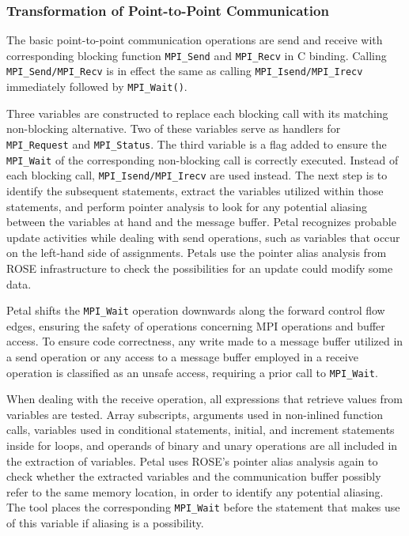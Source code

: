 \subsubsection{Transformation of Point-to-Point Communication}

The basic point-to-point communication operations are send and receive with corresponding blocking function  \texttt{MPI\_Send} and \texttt{MPI\_Recv} in C binding. 
Calling \texttt{MPI\_Send/MPI\_Recv} is in effect the same as calling \texttt{MPI\_Isend/MPI\_Irecv} immediately followed by \texttt{MPI\_Wait()}.

Three variables are constructed to replace each blocking call with its matching non-blocking alternative. 
Two of these variables serve as handlers for \texttt{MPI\_Request} and \texttt{MPI\_Status}. The third variable is a flag added to ensure the \texttt{MPI\_Wait} of the corresponding non-blocking call is correctly executed. 
Instead of each blocking call, \texttt{MPI\_Isend/MPI\_Irecv} are used instead. The next step is to identify the subsequent statements, extract the variables utilized within those statements, and perform pointer analysis to look for any potential aliasing between the variables at hand and the message buffer. 
Petal recognizes probable update activities while dealing with send operations, such as variables that occur on the left-hand side of assignments. 
Petals use the pointer alias analysis from ROSE infrastructure to check the possibilities for an update could modify some data.

Petal shifts the \texttt{MPI\_Wait} operation downwards along the forward control flow edges, ensuring the safety of operations concerning MPI operations and buffer access. 
To ensure code correctness, any write made to a message buffer utilized in a send operation or any access to a message buffer employed in a receive operation is classified as an unsafe access, requiring a prior call to \texttt{MPI\_Wait}.

When dealing with the receive operation, all expressions that retrieve values from variables are tested.
Array subscripts, arguments used in non-inlined function calls, variables used in conditional statements, initial, and increment statements inside for loops, and operands of binary and unary operations are all included in the extraction of variables. 
Petal uses ROSE's pointer alias analysis again to check whether the extracted variables and the communication buffer possibly refer to the same memory location, in order to identify any potential aliasing. 
The tool places the corresponding \texttt{MPI\_Wait} before the statement that makes use of this variable if aliasing is a possibility.

